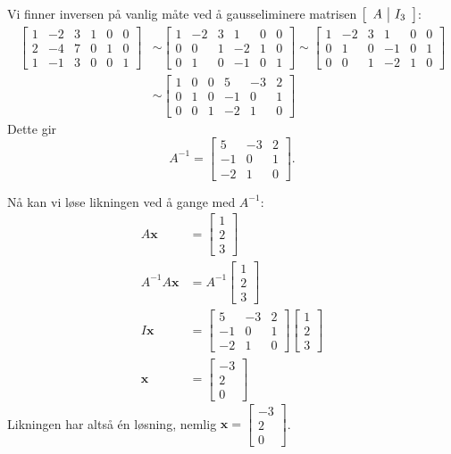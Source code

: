 \documentclass[notitlepage,a4paper,12pt,norsk]{IMFeksamen}
\newcommand{\roweq}{\sim}
\newcommand{\V}[1]{\mathbf{#1}}
\newcommand{\vvv}[3]{\begin{bmatrix} #1 \\ #2 \\ #3 \end{bmatrix}}
\newcommand{\x}{\V{x}}
\newcommand{\0}{\V{0}}
\newenvironment{amatrix}[1]{%
  \left[\begin{array}{*{#1}{c}|c}
}{%
  \end{array}\right]
}
\newcommand{\oppgslutt}{
\begin{center}
\pgfornament[width=6cm]{88}
\end{center}
}
\newenvironment{losning}{\begin{oppgave}}{\oppgslutt\end{oppgave}}
\begin{document}
\begin{losning}
Vi finner inversen på vanlig måte ved å gausseliminere matrisen
$\begin{amatrix}{1} A & I_3 \end{amatrix}$:
\begin{align*}
\left[
\begin{array}{ccc|ccc}
1 & -2 & 3 & 1 & 0 & 0\\
2 & -4 & 7 & 0 & 1 & 0\\
1 & -1 & 3 & 0 & 0 & 1
\end{array}
\right]
&\roweq
\left[
\begin{array}{ccc|ccc}
1 & -2 & 3 & 1  & 0 & 0\\
0 & 0  & 1 & -2 & 1 & 0\\
0 & 1  & 0 & -1 & 0 & 1
\end{array}
\right]
\roweq 
\left[
\begin{array}{ccc|ccc}
1 & -2 & 3 & 1  & 0 & 0\\
0 & 1  & 0 & -1 & 0 & 1\\
0 & 0  & 1 & -2 & 1 & 0
\end{array}
\right]\\
&\roweq
\left[
\begin{array}{ccc|ccc}
1 & 0 & 0 & 5  & -3 & 2\\
0 & 1 & 0 & -1 & 0  & 1\\
0 & 0 & 1 & -2 & 1  & 0
\end{array}
\right]
\end{align*}
Dette gir
\[
A^{-1}=
\begin{bmatrix}
5  & -3 & 2\\
-1 & 0  & 1\\
-2 & 1  & 0
\end{bmatrix}.
\]

Nå kan vi løse likningen ved å gange med $A^{-1}$:
\begin{align*}
A\x&=\vvv{1}{2}{3}\\
A^{-1}A\x&=A^{-1}\vvv{1}{2}{3}\\
I\x&=\begin{bmatrix}
5  & -3 & 2\\
-1 & 0  & 1\\
-2 & 1  & 0
\end{bmatrix}
\vvv{1}{2}{3}\\
\x&=\vvv{-3}{2}{0}
\end{align*}
Likningen har altså én løsning, nemlig
$\x = \vvv{-3}{2}{0}$.
\end{losning}
\end{document}
